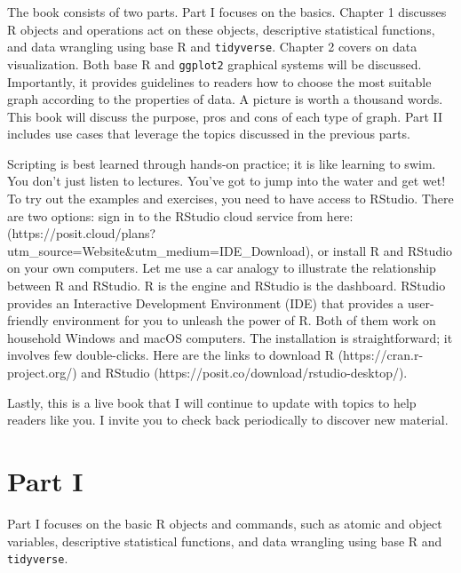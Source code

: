 \documentclass[
  letterpaper,
]{book}
\begin{document}

The book consists of two parts. Part I focuses on the basics. Chapter 1
discusses R objects and operations act on these objects, descriptive
statistical functions, and data wrangling using base R and
\texttt{tidyverse}. Chapter 2 covers on data visualization. Both base R
and \texttt{ggplot2} graphical systems will be discussed. Importantly,
it provides guidelines to readers how to choose the most suitable graph
according to the properties of data. A picture is worth a thousand
words. This book will discuss the purpose, pros and cons of each type of
graph. Part II includes use cases that leverage the topics discussed in
the previous parts.

Scripting is best learned through hands-on practice; it is like learning
to swim. You don't just listen to lectures. You've got to jump into the
water and get wet! To try out the examples and exercises, you need to
have access to RStudio. There are two options: sign in to the RStudio
cloud service from here:
(https://posit.cloud/plans?utm\_source=Website\&utm\_medium=IDE\_Download),
or install R and RStudio on your own computers. Let me use a car analogy
to illustrate the relationship between R and RStudio. R is the engine
and RStudio is the dashboard. RStudio provides an Interactive
Development Environment (IDE) that provides a user-friendly environment
for you to unleash the power of R. Both of them work on household
Windows and macOS computers. The installation is straightforward; it
involves few double-clicks. Here are the links to download R
(https://cran.r-project.org/) and RStudio
(https://posit.co/download/rstudio-desktop/).

Lastly, this is a live book that I will continue to update with topics
to help readers like you. I invite you to check back periodically to
discover new material.


\chapter*{Part I}\label{part-i}


Part I focuses on the basic R objects and commands, such as atomic and
object variables, descriptive statistical functions, and data wrangling
using base R and \texttt{tidyverse}.

\end{document}
